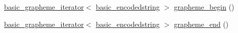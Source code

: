 {\bf }\par
\begin{DoxyCompactItemize}
\item 
\hyperlink{classu5e_1_1basic__grapheme__iterator}{basic\+\_\+grapheme\+\_\+iterator}$<$ \hyperlink{classu5e_1_1basic__encodedstring}{basic\+\_\+encodedstring} $>$ \hyperlink{classu5e_1_1basic__encodedstring_a8c66254c1ea54fd290fff2c7fc6b2f75}{grapheme\+\_\+begin} ()
\item 
\hyperlink{classu5e_1_1basic__grapheme__iterator}{basic\+\_\+grapheme\+\_\+iterator}$<$ \hyperlink{classu5e_1_1basic__encodedstring}{basic\+\_\+encodedstring} $>$ \hyperlink{classu5e_1_1basic__encodedstring_ab4febf8ab197b789efc546d8ac66b842}{grapheme\+\_\+end} ()
\end{DoxyCompactItemize}

{\bf }\par
